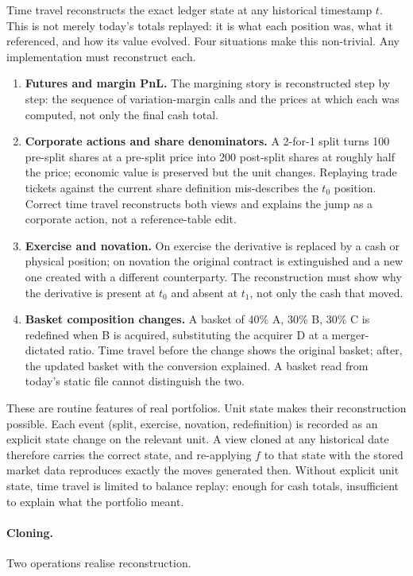 Time travel reconstructs the exact ledger state at any historical timestamp $t$. This is not merely today's totals replayed: it is what each position was, what it referenced, and how its value evolved. Four situations make this non-trivial. Any implementation must reconstruct each.

\begin{enumerate}
\item \textbf{Futures and margin PnL.} The margining story is reconstructed step by step: the sequence of variation-margin calls and the prices at which each was computed, not only the final cash total.
\item \textbf{Corporate actions and share denominators.} A 2-for-1 split turns 100 pre-split shares at a pre-split price into 200 post-split shares at roughly half the price; economic value is preserved but the unit changes. Replaying trade tickets against the current share definition mis-describes the $t_0$ position. Correct time travel reconstructs both views and explains the jump as a corporate action, not a reference-table edit.
\item \textbf{Exercise and novation.} On exercise the derivative is replaced by a cash or physical position; on novation the original contract is extinguished and a new one created with a different counterparty. The reconstruction must show why the derivative is present at $t_0$ and absent at $t_1$, not only the cash that moved.
\item \textbf{Basket composition changes.} A basket of 40\% A, 30\% B, 30\% C is redefined when B is acquired, substituting the acquirer D at a merger-dictated ratio. Time travel before the change shows the original basket; after, the updated basket with the conversion explained. A basket read from today's static file cannot distinguish the two.
\end{enumerate}

These are routine features of real portfolios. Unit state makes their reconstruction possible. Each event (split, exercise, novation, redefinition) is recorded as an explicit state change on the relevant unit. A view cloned at any historical date therefore carries the correct state, and re-applying $f$ to that state with the stored market data reproduces exactly the moves generated then. Without explicit unit state, time travel is limited to balance replay: enough for cash totals, insufficient to explain what the portfolio meant.

\paragraph{Cloning.} Two operations realise reconstruction.

